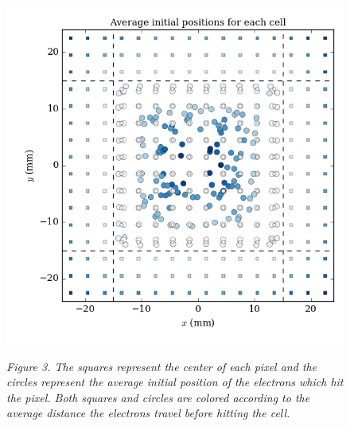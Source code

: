 \documentclass[12pt]{article}
\begin{document}
\begin{center}
\begin{figure}
\includegraphics[scale=0.9]{../XY_stats.png}

\textit{Figure 3. The squares represent the center of each pixel and the circles represent the average initial position of the electrons which hit the pixel. Both squares and circles are colored according to the average distance the electrons travel before hitting the cell.} 
\end{figure}
\end{center}
\end{document}
